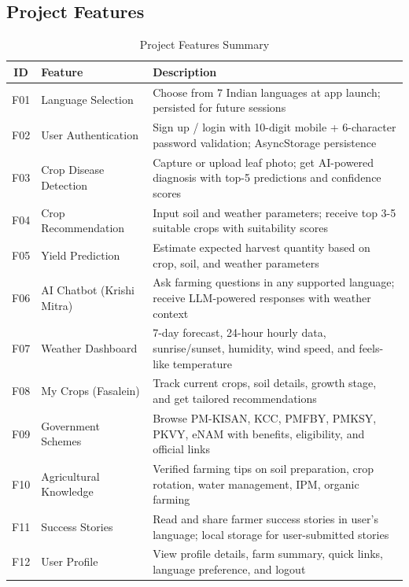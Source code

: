 \documentclass[12pt,a4paper]{article}
\newcommand{\tablefont}{\fontsize{10}{12}\selectfont}
\begin{document}
\subsection{Project Features}

\begin{table}[H]
\centering
\tablefont
\begin{tabular}{|c|p{3.5cm}|p{7.5cm}|}
\hline
\textbf{ID} & \textbf{Feature} & \textbf{Description} \\
\hline
F01 & Language Selection & Choose from 7 Indian languages at app launch; persisted for future sessions \\
F02 & User Authentication & Sign up / login with 10-digit mobile + 6-character password validation; AsyncStorage persistence \\
F03 & Crop Disease Detection & Capture or upload leaf photo; get AI-powered diagnosis with top-5 predictions and confidence scores \\
F04 & Crop Recommendation & Input soil and weather parameters; receive top 3-5 suitable crops with suitability scores \\
F05 & Yield Prediction & Estimate expected harvest quantity based on crop, soil, and weather parameters \\
F06 & AI Chatbot (Krishi Mitra) & Ask farming questions in any supported language; receive LLM-powered responses with weather context \\
F07 & Weather Dashboard & 7-day forecast, 24-hour hourly data, sunrise/sunset, humidity, wind speed, and feels-like temperature \\
F08 & My Crops (Fasalein) & Track current crops, soil details, growth stage, and get tailored recommendations \\
F09 & Government Schemes & Browse PM-KISAN, KCC, PMFBY, PMKSY, PKVY, eNAM with benefits, eligibility, and official links \\
F10 & Agricultural Knowledge & Verified farming tips on soil preparation, crop rotation, water management, IPM, organic farming \\
F11 & Success Stories & Read and share farmer success stories in user's language; local storage for user-submitted stories \\
F12 & User Profile & View profile details, farm summary, quick links, language preference, and logout \\
\hline
\end{tabular}
\caption{Project Features Summary}
\end{table}
\end{document}
